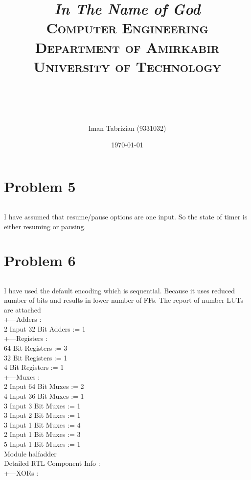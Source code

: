 \documentclass[paper=a4, fontsize=11pt]{scrartcl} %
\title{
\normalfont \normalsize
\textit{In The Name of God} \\ \textsc{Computer Engineering Department of Amirkabir University of Technology} \\ [25pt] \horrule{0.5pt} \\[0.4cm] %
\horrule{2pt} \\[0.5cm] %
}
\author{Iman Tabrizian (9331032)}
\date{\normalsize\today}
\numberwithin{equation}{section} %
\numberwithin{figure}{section} %
\numberwithin{table}{section} %
\begin{document}
\maketitle


\section{Problem 5}
\inputminted{vhdl}{q5/src/timer.vhd}
\par I have assumed that resume/pause options are one input. So the state of
timer is either resuming or pausing.

\section{Problem 6}
\inputminted{vhdl}{q6/a/src/lock.vhd}
\par I have used the default encoding which is sequential. Because it uses reduced
number of bits and results in lower number of FFs.
The report of number LUTs are attached \\
+---Adders : \\
	   2 Input     32 Bit       Adders := 1 \\
+---Registers : \\
	               64 Bit    Registers := 3 \\
	               32 Bit    Registers := 1 \\
	                4 Bit    Registers := 1 \\
+---Muxes :                                 \\
	   2 Input     64 Bit        Muxes := 2 \\
	   4 Input     36 Bit        Muxes := 1 \\
	   3 Input      3 Bit        Muxes := 1 \\
	   3 Input      2 Bit        Muxes := 1 \\
	   3 Input      1 Bit        Muxes := 4 \\
	   2 Input      1 Bit        Muxes := 3 \\
	   5 Input      1 Bit        Muxes := 1 \\
Module halfadder                            \\
Detailed RTL Component Info :               \\
+---XORs :                                  \\
\end{document}
